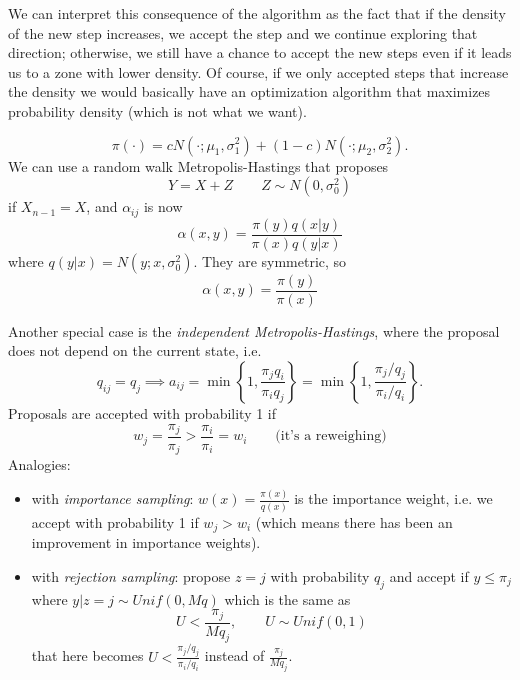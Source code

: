 \documentclass{article}
\begin{document}
	We can interpret this consequence of the algorithm as the fact that if the density of the new step increases, we accept the step and we continue exploring that direction; otherwise, we still have a chance to accept the new steps even if it leads us to a zone with lower density. Of course, if we only accepted steps that increase the density we would basically have an optimization algorithm that maximizes probability density (which is not what we want).
	\begin{example}
		\[
		\pi(\cdot)=cN(\cdot;\mu_1,\sigma_1^2)+(1-c)N(\cdot;\mu_2,\sigma_2^2).
		\]
		We can use a random walk Metropolis-Hastings that proposes
		\[
		Y=X+Z\qquad Z\sim N(0,\sigma_0^2)
		\]
		if $X_{n-1}=X$, and $\alpha_{ij}$ is now
		\[
		\alpha(x,y)=\frac{\pi(y)q(x|y)}{\pi(x)q(y|x)}
		\]
		where $q(y|x)=N(y;x,\sigma_0^2)$. They are symmetric, so
		\[
		\alpha(x,y)=\frac{\pi(y)}{\pi(x)}
		\]
	\end{example}
	Another special case is the \textit{independent Metropolis-Hastings}, where the proposal does not depend on the current state, i.e.
	\[
	q_{ij}=q_j\implies a_{ij}=\min\left\{1,\frac{\pi_jq_i}{\pi_iq_j}\right\}=\min\left\{1,\frac{\pi_j/q_j}{\pi_i/q_i}\right\}.
	\]
	Proposals are accepted with probability 1 if
	\[
	w_j=\frac{\pi_j}{\pi_j}>\frac{\pi_i}{\pi_i}=w_i\qquad\text{(it's a reweighing)}
	\]
	Analogies:
	\begin{itemize}
		\item with \textit{importance sampling}: $w(x)=\frac{\pi(x)}{q(x)}$ is the importance weight, i.e. we accept with probability 1 if $w_j>w_i$ (which means there has been an improvement in importance weights).
		\item with \textit{rejection sampling}: propose $z=j$ with probability $q_j$ and accept if $y\leqslant\pi_j$ where $y|z=j\sim Unif(0,Mq)$ which is the same as \[
		U<\frac{\pi_j}{Mq_j},\qquad U\sim Unif(0,1)
		\]
		that here becomes $U<\frac{\pi_j/q_j}{\pi_i/q_i}$ instead of $\frac{\pi_j}{Mq_j}$.
	\end{itemize}
\end{document}
